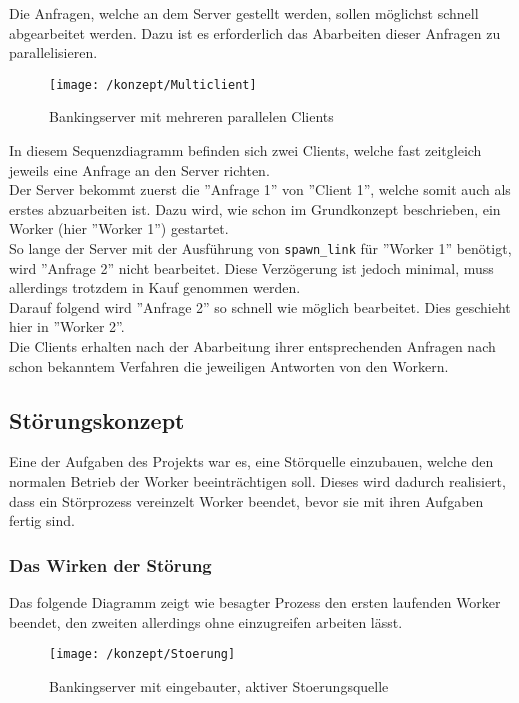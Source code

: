 Die Anfragen, welche an dem Server gestellt werden, sollen möglichst schnell abgearbeitet werden. Dazu ist es erforderlich das Abarbeiten dieser Anfragen zu parallelisieren.

\begin{figure}
\centering
\texttt{[image: /konzept/Multiclient]}
\caption{Bankingserver mit mehreren parallelen Clients}
\label{fig:multiclient}
\end{figure}

In diesem Sequenzdiagramm befinden sich zwei Clients, welche fast zeitgleich jeweils eine Anfrage an den Server richten.\\
Der Server bekommt zuerst die ''Anfrage 1'' von ''Client 1'', welche somit auch als erstes abzuarbeiten ist. Dazu wird, wie schon im Grundkonzept beschrieben, ein Worker (hier ''Worker 1'') gestartet.\\
So lange der Server mit der Ausführung von \texttt{spawn\_link} für ''Worker 1'' benötigt, wird ''Anfrage 2'' nicht bearbeitet. Diese Verzögerung ist jedoch minimal, muss allerdings trotzdem in Kauf genommen werden.\\
Darauf folgend wird ''Anfrage 2'' so schnell wie möglich bearbeitet. Dies geschieht hier in ''Worker 2''.\\
Die Clients erhalten nach der Abarbeitung ihrer entsprechenden Anfragen nach schon bekanntem Verfahren die jeweiligen Antworten von den Workern.

\subsection{Störungskonzept}

Eine der Aufgaben des Projekts war es, eine Störquelle einzubauen, welche den normalen Betrieb der Worker beeinträchtigen soll. Dieses wird dadurch realisiert, dass ein Störprozess vereinzelt Worker beendet, bevor sie mit ihren Aufgaben fertig sind.\\

\subsubsection{Das Wirken der Störung}

Das folgende Diagramm zeigt wie besagter Prozess den ersten laufenden Worker beendet, den zweiten allerdings ohne einzugreifen arbeiten lässt.\\

\begin{figure}
\centering
\texttt{[image: /konzept/Stoerung]}
\caption{Bankingserver mit eingebauter, aktiver Stoerungsquelle}
\label{fig:stoerung}
\end{figure}

